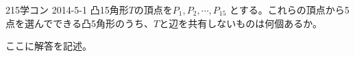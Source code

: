 \begin{thm}{215}{}{学コン 2014-5-1}
 凸15角形$T$の頂点を$P_1, P_2, \cdots, P_{15}$ とする。これらの頂点から5点を選んでできる凸5角形のうち、$T$と辺を共有しないものは何個あるか。
\end{thm}

ここに解答を記述。